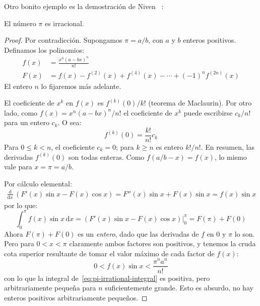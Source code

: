   Otro bonito ejemplo es la demostración de Niven~%
    \cite{niven47:_simple_proof_pi_irrat}:
  \begin{theorem}
    \label{theo:pi-irrational}
    El número \(\pi\) es irracional.
  \end{theorem}
  \begin{proof}
    Por contradicción.%
    Supongamos \(\pi = a / b\),
    con \(a\) y \(b\) enteros positivos.
    Definamos los polinomios:
    \begin{align*}
      f(x)
	&= \frac{x^n (a - b x)^n}{n!} \\
      F(x)
	&= f(x)
	     - f^{(2)}(x)
	     + f^{(4)}(x)
	     - \dotsb
	     + (-1)^n f^{(2 n)} (x)
    \end{align*}
    El entero \(n\) lo fijaremos más adelante.

    El coeficiente de \(x^k\) en \(f(x)\) es \(f^{(k)}(0) / k!\)
    (teorema de Maclaurin).%
    Por otro lado,
    como \(f(x) = x^n (a - b x)^n / n!\)
    el coeficiente de \(x^k\)
    puede escribirse \(c_k / n!\) para un entero \(c_k\).
    O sea:
    \begin{equation*}
      f^{(k)}(0)
	= \frac{k!}{n!} c_k
    \end{equation*}
    Para \(0 \le k < n\),
    el coeficiente \(c_k = 0\);
    para \(k \ge n\) es entero \(k! / n!\).
    En resumen,
    las derivadas \(f^{(k)}(0)\) son todas enteras.
    Como \(f(a / b - x) = f(x)\),
    lo mismo vale para \(x = \pi = a / b\).

    Por cálculo elemental:
    \begin{align*}
      \frac{\mathrm{d}}{\mathrm{d} x} \,
	\left( F'(x) \sin x - F(x) \cos x \right)
	= F''(x) \sin x + F(x) \sin x
	= f(x) \sin x
    \end{align*}
    por lo que:
    \begin{equation}
      \label{eq:pi-irrational-integral}
      \int_0^\pi f(x) \sin x \, \mathrm{d} x
	= \left( F'(x) \sin x - F(x) \cos x \right)
	    \big\rvert_0^\pi
	= F(\pi) + F(0)
    \end{equation}
    Ahora \(F(\pi) + F(0)\) es un \emph{entero},
    dado que las derivadas de \(f\) en \(0\) y \(\pi\) lo son.
    Pero para \(0 < x < \pi\)
    claramente ambos factores son positivos,
    y tenemos la cruda cota superior
    resultante de tomar el valor máximo de cada factor de \(f(x)\):
    \begin{equation*}
      0 < f(x) \sin x < \frac{\pi^n a^n}{n!}
    \end{equation*}
    con lo que la integral de~\eqref{eq:pi-irrational-integral}
    es positiva,
    pero arbitrariamente pequeña para \(n\) suficientemente grande.
    Esto es absurdo,
    no hay enteros positivos arbitrariamente pequeños.
  \end{proof}

